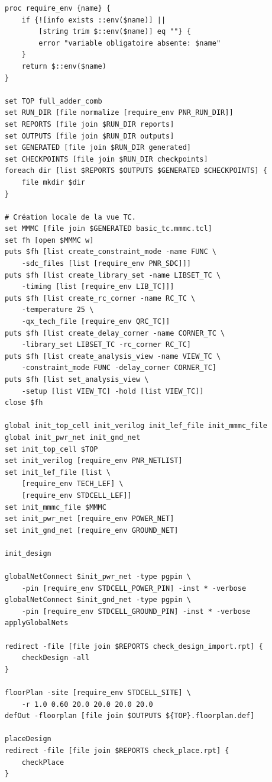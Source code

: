 \documentclass[11pt,a4paper,openany]{report}
\begin{document}
\begin{lstlisting}[style=guidecode,language=TclGuide,
caption={innovus\_minimal.tcl}]
proc require_env {name} {
    if {![info exists ::env($name)] ||
        [string trim $::env($name)] eq ""} {
        error "variable obligatoire absente: $name"
    }
    return $::env($name)
}

set TOP full_adder_comb
set RUN_DIR [file normalize [require_env PNR_RUN_DIR]]
set REPORTS [file join $RUN_DIR reports]
set OUTPUTS [file join $RUN_DIR outputs]
set GENERATED [file join $RUN_DIR generated]
set CHECKPOINTS [file join $RUN_DIR checkpoints]
foreach dir [list $REPORTS $OUTPUTS $GENERATED $CHECKPOINTS] {
    file mkdir $dir
}

# Création locale de la vue TC.
set MMMC [file join $GENERATED basic_tc.mmmc.tcl]
set fh [open $MMMC w]
puts $fh [list create_constraint_mode -name FUNC \
    -sdc_files [list [require_env PNR_SDC]]]
puts $fh [list create_library_set -name LIBSET_TC \
    -timing [list [require_env LIB_TC]]]
puts $fh [list create_rc_corner -name RC_TC \
    -temperature 25 \
    -qx_tech_file [require_env QRC_TC]]
puts $fh [list create_delay_corner -name CORNER_TC \
    -library_set LIBSET_TC -rc_corner RC_TC]
puts $fh [list create_analysis_view -name VIEW_TC \
    -constraint_mode FUNC -delay_corner CORNER_TC]
puts $fh [list set_analysis_view \
    -setup [list VIEW_TC] -hold [list VIEW_TC]]
close $fh

global init_top_cell init_verilog init_lef_file init_mmmc_file
global init_pwr_net init_gnd_net
set init_top_cell $TOP
set init_verilog [require_env PNR_NETLIST]
set init_lef_file [list \
    [require_env TECH_LEF] \
    [require_env STDCELL_LEF]]
set init_mmmc_file $MMMC
set init_pwr_net [require_env POWER_NET]
set init_gnd_net [require_env GROUND_NET]

init_design

globalNetConnect $init_pwr_net -type pgpin \
    -pin [require_env STDCELL_POWER_PIN] -inst * -verbose
globalNetConnect $init_gnd_net -type pgpin \
    -pin [require_env STDCELL_GROUND_PIN] -inst * -verbose
applyGlobalNets

redirect -file [file join $REPORTS check_design_import.rpt] {
    checkDesign -all
}

floorPlan -site [require_env STDCELL_SITE] \
    -r 1.0 0.60 20.0 20.0 20.0 20.0
defOut -floorplan [file join $OUTPUTS ${TOP}.floorplan.def]

placeDesign
redirect -file [file join $REPORTS check_place.rpt] {
    checkPlace
}


\end{lstlisting}
\end{document}
